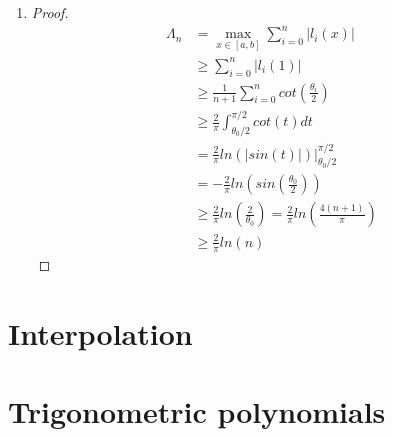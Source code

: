 \documentclass[paper=a4, fontsize=11pt]{scrartcl} %
\numberwithin{equation}{section} %
\numberwithin{figure}{section} %
\numberwithin{table}{section} %
\begin{document}
\begin{enumerate}
\begin{enumerate}
			\item 
				\begin{proof}
					As $\theta_n = \frac{2n+1}{2n+2}\pi < \pi$, $\theta_{n+1} = \frac{2n+3}{2n+2} > \pi$, and $cot(x)$ is positive over $(0, \frac{\pi}{2})$, while negative otherwise.
					Thus
					\begin{equation}
							\int_{\frac{\theta_0}{2}}^{\frac{\pi}{2}} cot(t) dt 
							\leq \int_{\frac{\theta_0}{2}}^{\frac{\theta_n}{2}} cot(t) dt
							= \sum_{k=0}^{n-1} \int_{\frac{\theta_k}{2}}^{\frac{\theta_{k+1}}{2}} cot(t) dt
					\end{equation}
					Hence
					\begin{equation}
						\int_{\frac{\theta_0}{2}}^{\frac{\pi}{2}} cot(t) dt \leq \frac{\pi}{2(n+1)} \sum_{i=0}^{n}cot(\frac{\theta_i}{2})
					\end{equation}
					(... not fine)
				\end{proof}
			
		\end{enumerate}

	\item 
		\begin{proof}
			\begin{equation}
				\begin{aligned}
					\Lambda_n & = \max_{x \in [a, b]} \sum_{i=0}^{n} |l_i(x)|\\
							  & \geq \sum_{i=0}^{n} |l_i(1)|\\
							  & \geq \frac{1}{n+1} \sum_{i=0}^{n} cot(\frac{\theta_i}{2})\\
							  & \geq \frac{2}{\pi} \int_{\theta_0 / 2}^{\pi/2} cot(t)dt\\
							  & = \frac{2}{\pi} ln(|sin(t)|) \Bigg| _{\theta_0/2}^{\pi/2}\\
							  & = - \frac{2}{\pi} ln(sin(\frac{\theta_0}{2}))\\
							  & \geq \frac{2}{\pi} ln(\frac{2}{\theta_0}) = \frac{2}{\pi} ln(\frac{4(n+1)}{\pi})\\
							  & \ge \frac{2}{\pi} ln(n)
				\end{aligned}
			\end{equation}
		\end{proof}
	
\end{enumerate}


\section{Interpolation}

	
\section{Trigonometric polynomials}
\end{document}
